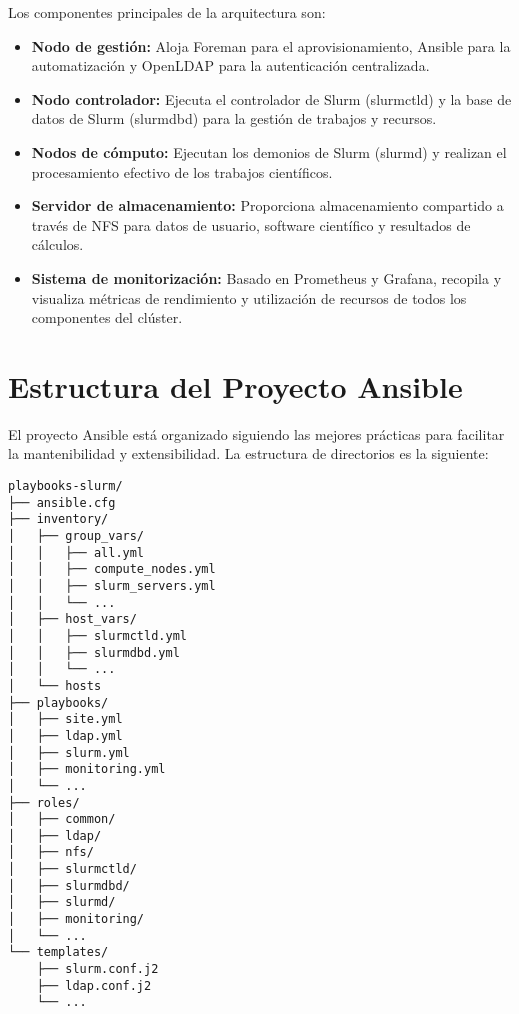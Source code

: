 \documentclass[12pt,a4paper]{report}
\begin{document}
Los componentes principales de la arquitectura son:

\begin{itemize}
    \item \textbf{Nodo de gestión:} Aloja Foreman para el aprovisionamiento, Ansible para la automatización y OpenLDAP para la autenticación centralizada.
    
    \item \textbf{Nodo controlador:} Ejecuta el controlador de Slurm (slurmctld) y la base de datos de Slurm (slurmdbd) para la gestión de trabajos y recursos.
    
    \item \textbf{Nodos de cómputo:} Ejecutan los demonios de Slurm (slurmd) y realizan el procesamiento efectivo de los trabajos científicos.
    
    \item \textbf{Servidor de almacenamiento:} Proporciona almacenamiento compartido a través de NFS para datos de usuario, software científico y resultados de cálculos.
    
    \item \textbf{Sistema de monitorización:} Basado en Prometheus y Grafana, recopila y visualiza métricas de rendimiento y utilización de recursos de todos los componentes del clúster.
\end{itemize}

\section{Estructura del Proyecto Ansible}

El proyecto Ansible está organizado siguiendo las mejores prácticas para facilitar la mantenibilidad y extensibilidad. La estructura de directorios es la siguiente:

\begin{lstlisting}
playbooks-slurm/
├── ansible.cfg
├── inventory/
│   ├── group_vars/
│   │   ├── all.yml
│   │   ├── compute_nodes.yml
│   │   ├── slurm_servers.yml
│   │   └── ...
│   ├── host_vars/
│   │   ├── slurmctld.yml
│   │   ├── slurmdbd.yml
│   │   └── ...
│   └── hosts
├── playbooks/
│   ├── site.yml
│   ├── ldap.yml
│   ├── slurm.yml
│   ├── monitoring.yml
│   └── ...
├── roles/
│   ├── common/
│   ├── ldap/
│   ├── nfs/
│   ├── slurmctld/
│   ├── slurmdbd/
│   ├── slurmd/
│   ├── monitoring/
│   └── ...
└── templates/
    ├── slurm.conf.j2
    ├── ldap.conf.j2
    └── ...
\end{lstlisting}
\end{document}
